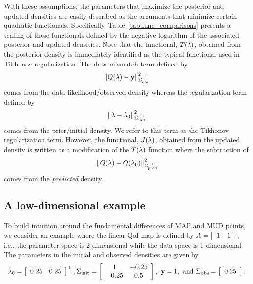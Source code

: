 With these assumptions, the parameters that maximize the posterior and updated densities are easily described as the arguments that minimize certain quadratic functionals.
Specifically, Table~\ref{tab:func_comparisons} presents a scaling of these functionals defined by the negative logarithm of the associated posterior and updated densities.
Note that the functional, $T(\param)$, obtained from the posterior density is immediately identified as the typical functional used in Tikhonov regularization.
The data-mismatch term defined by
\begin{equation*}
	\norm{Q(\param)-\observedMean}_{\observedCov^{-1}}^2
\end{equation*}
comes from the data-likelihood/observed density whereas the regularization term defined by
\begin{equation*}
	 \norm{\param-\initialMean}_{\initialCov^{-1}}^2
\end{equation*}
comes from the prior/initial density.
We refer to this term as the Tikhonov regularization term.
However, the functional, $J(\param)$, obtained from the updated density is written as a modification of the $T(\param)$ function where the subtraction of
\begin{equation*}
	 \norm{Q(\param)-Q(\initialMean)}_{\predictedCov^{-1}}^2
\end{equation*}
comes from the {\em predicted} density.

\subsection{A low-dimensional example}\label{subsec:low-d-example}

To build intuition around the fundamental differences of MAP and MUD points, we consider an example where the linear QoI map is defined by $A=\mat{cc}{1 & 1}$, i.e., the parameter space is 2-dimensional while the data space is 1-dimensional.
The parameters in the initial and observed densities are given by
\[
	\initialMean = \mat{cc}{0.25 & 0.25}^\top, \initialCov = \mat{cc}{1 & -0.25 \\ -0.25 & 0.5}, \ \observedMean=1, \text{ and } \observedCov = \mat{c}{0.25}.
\]

